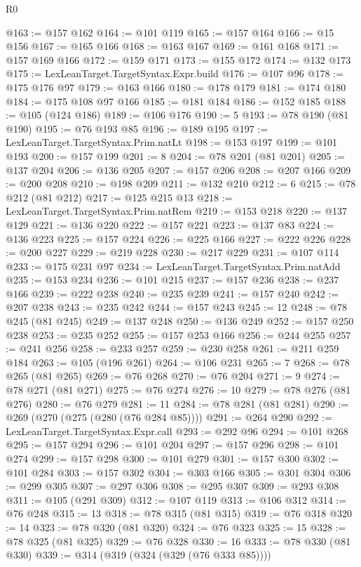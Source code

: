 \begin{lexlean}{R0}
\begin{coremodule}
@163 := @157 @162
@164 := @101 @119
@165 := @157 @164
@166 := @15 @156
@167 := @165 @166
@168 := @163 @167
@169 := @161 @168
@171 := @157 @169 @166
@172 := @159 @171
@173 := @155 @172
@174 := @132 @173
@175 := LexLeanTarget.TargetSyntax.Expr.build
@176 := @107 @96
@178 := @175 @176 @97
@179 := @163 @166
@180 := @178 @179
@181 := @174 @180
@184 := @175 @108 @97 @166
@185 := @181 @184
@186 := @152 @185
@188 := @105 (@124 @186)
@189 := @106 @176
@190 := 5
@193 := @78 @190 (@81 @190)
@195 := @76 @193 @85
@196 := @189 @195
@197 := LexLeanTarget.TargetSyntax.Prim.natLt
@198 := @153 @197
@199 := @101 @193
@200 := @157 @199
@201 := 8
@204 := @78 @201 (@81 @201)
@205 := @137 @204
@206 := @136 @205
@207 := @157 @206
@208 := @207 @166
@209 := @200 @208
@210 := @198 @209
@211 := @132 @210
@212 := 6
@215 := @78 @212 (@81 @212)
@217 := @125 @215 @13
@218 := LexLeanTarget.TargetSyntax.Prim.natRem
@219 := @153 @218
@220 := @137 @129
@221 := @136 @220
@222 := @157 @221
@223 := @137 @83
@224 := @136 @223
@225 := @157 @224
@226 := @225 @166
@227 := @222 @226
@228 := @200 @227
@229 := @219 @228
@230 := @217 @229
@231 := @107 @114
@233 := @175 @231 @97
@234 := LexLeanTarget.TargetSyntax.Prim.natAdd
@235 := @153 @234
@236 := @101 @215
@237 := @157 @236
@238 := @237 @166
@239 := @222 @238
@240 := @235 @239
@241 := @157 @240
@242 := @207 @238
@243 := @235 @242
@244 := @157 @243
@245 := 12
@248 := @78 @245 (@81 @245)
@249 := @137 @248
@250 := @136 @249
@252 := @157 @250 @238
@253 := @235 @252
@255 := @157 @253 @166
@256 := @244 @255
@257 := @241 @256
@258 := @233 @257
@259 := @230 @258
@261 := @211 @259 @184
@263 := @105 (@196 @261)
@264 := @106 @231
@265 := 7
@268 := @78 @265 (@81 @265)
@269 := @76 @268
@270 := @76 @204
@271 := 9
@274 := @78 @271 (@81 @271)
@275 := @76 @274
@276 := 10
@279 := @78 @276 (@81 @276)
@280 := @76 @279
@281 := 11
@284 := @78 @281 (@81 @281)
@290 := @269 (@270 (@275 (@280 (@76 @284 @85))))
@291 := @264 @290
@292 := LexLeanTarget.TargetSyntax.Expr.call
@293 := @292 @96
@294 := @101 @268
@295 := @157 @294
@296 := @101 @204
@297 := @157 @296
@298 := @101 @274
@299 := @157 @298
@300 := @101 @279
@301 := @157 @300
@302 := @101 @284
@303 := @157 @302
@304 := @303 @166
@305 := @301 @304
@306 := @299 @305
@307 := @297 @306
@308 := @295 @307
@309 := @293 @308
@311 := @105 (@291 @309)
@312 := @107 @119
@313 := @106 @312
@314 := @76 @248
@315 := 13
@318 := @78 @315 (@81 @315)
@319 := @76 @318
@320 := 14
@323 := @78 @320 (@81 @320)
@324 := @76 @323
@325 := 15
@328 := @78 @325 (@81 @325)
@329 := @76 @328
@330 := 16
@333 := @78 @330 (@81 @330)
@339 := @314 (@319 (@324 (@329 (@76 @333 @85))))

\end{coremodule}
\end{lexlean}
